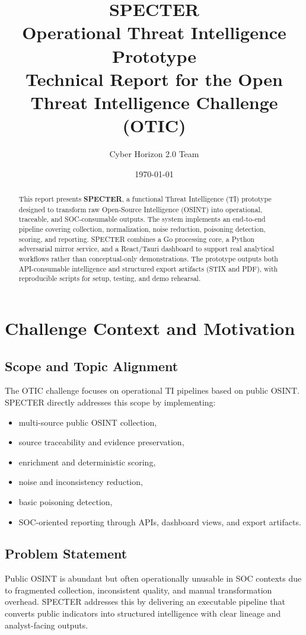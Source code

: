 \documentclass[11pt,a4paper]{article}
\title{\textbf{SPECTER}\\[2mm]
\Large Operational Threat Intelligence Prototype\\
\large Technical Report for the Open Threat Intelligence Challenge (OTIC)}
\author{Cyber Horizon 2.0 Team}
\date{\today}
\begin{document}
\maketitle
\onehalfspacing

\begin{abstract}
This report presents \textbf{SPECTER}, a functional Threat Intelligence (TI) prototype designed to transform raw Open-Source Intelligence (OSINT) into operational, traceable, and SOC-consumable outputs. The system implements an end-to-end pipeline covering collection, normalization, noise reduction, poisoning detection, scoring, and reporting. SPECTER combines a Go processing core, a Python adversarial mirror service, and a React/Tauri dashboard to support real analytical workflows rather than conceptual-only demonstrations. The prototype outputs both API-consumable intelligence and structured export artifacts (STIX and PDF), with reproducible scripts for setup, testing, and demo rehearsal.
\end{abstract}

\tableofcontents
\newpage

\section{Challenge Context and Motivation}

\subsection{Scope and Topic Alignment}
The OTIC challenge focuses on operational TI pipelines based on public OSINT. SPECTER directly addresses this scope by implementing:
\begin{itemize}[leftmargin=1.5em]
    \item multi-source public OSINT collection,
    \item source traceability and evidence preservation,
    \item enrichment and deterministic scoring,
    \item noise and inconsistency reduction,
    \item basic poisoning detection,
    \item SOC-oriented reporting through APIs, dashboard views, and export artifacts.
\end{itemize}

\subsection{Problem Statement}
Public OSINT is abundant but often operationally unusable in SOC contexts due to fragmented collection, inconsistent quality, and manual transformation overhead. SPECTER addresses this by delivering an executable pipeline that converts public indicators into structured intelligence with clear lineage and analyst-facing outputs.
\end{document}
